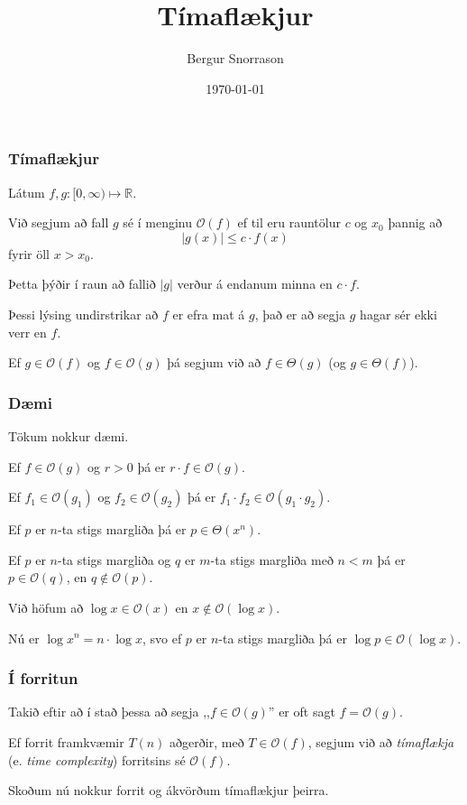 \title{Tímaflækjur}
\author{Bergur Snorrason}
\date{\today}



\frame{\titlepage}

{
	\frametitle{Tímaflækjur}
	{
		\item<1-> Látum $f, g \colon [0, \infty) \mapsto \mathbb{R}$.
		\item<2-> Við segjum að fall $g$ sé í menginu $\mathcal{O}(f)$ ef til eru rauntölur $c$ og $x_0$ þannig að
		\[
			|g(x)| \leq c \cdot f(x)
		\]
		fyrir öll $x > x_0$.
		\item<3-> Þetta þýðir í raun að fallið $|g|$ verður á endanum minna en $c \cdot f$.
		\item<4-> Þessi lýsing undirstrikar að $f$ er efra mat á $g$, það er að segja $g$ hagar sér ekki verr en $f$.
		\item<5-> Ef $g \in \mathcal{O}(f)$ og $f \in \mathcal{O}(g)$ þá segjum við að $f \in \Theta(g)$ (og $g \in \Theta(f)$).
	}
}

{
	\frametitle{Dæmi}
	{
		\item<1-> Tökum nokkur dæmi.
		\item<2-> Ef $f \in \mathcal{O}(g)$ og $r > 0$ þá er $r \cdot f \in \mathcal{O}(g)$.
		\item<3-> Ef $f_1 \in \mathcal{O}(g_1)$ og $f_2 \in \mathcal{O}(g_2)$ þá er $f_1 \cdot f_2 \in \mathcal{O}(g_1 \cdot g_2)$.
		\item<4-> Ef $p$ er $n$-ta stigs margliða þá er $p \in \Theta(x^n)$.
		\item<5-> Ef $p$ er $n$-ta stigs margliða og $q$ er $m$-ta stigs margliða með $n < m$ þá er $p \in \mathcal{O}(q)$,
					en $q \not \in \mathcal{O}(p)$.
		\item<6-> Við höfum að $\log x \in \mathcal{O}(x)$ en $x \not \in \mathcal{O}(\log x)$.
		\item<7-> Nú er $\log x^n = n \cdot \log x$, svo ef $p$ er $n$-ta stigs margliða þá er $\log p \in \mathcal{O}(\log x)$.
	}
}

{
	\frametitle{Í forritun}
	{
		\item<1-> Takið eftir að í stað þessa að segja ,,$f \in \mathcal{O}(g)$'' er oft sagt $f = \mathcal{O}(g)$.
		\item<2-> Ef forrit framkvæmir $T(n)$ aðgerðir,
					með $T \in \mathcal{O}(f)$,
					segjum við að \emph{tímaflækja} (e. \emph{time complexity}) forritsins sé $\mathcal{O}(f)$.
		\item<3-> Skoðum nú nokkur forrit og ákvörðum tímaflækjur þeirra.
	}
}

